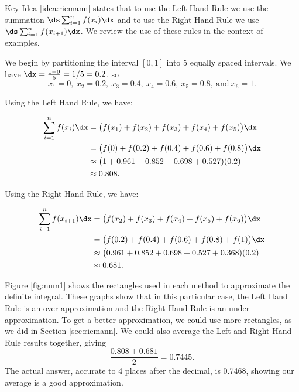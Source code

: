 Key Idea \ref{idea:riemann} states that to use the Left Hand Rule we use the summation $\ds \sum_{i=1}^n f(x_i)\dx$ and to use the Right Hand Rule we use $\ds \sum_{i=1}^n f(x_{i+1})\dx$. We review the use of these rules in the context of examples.\\

{We begin by partitioning the interval $[0,1]$ into 5 equally spaced intervals. We have $\dx = \frac{1-0}5 = 1/5=0.2$, so $$x_1 = 0,\ x_2 = 0.2,\ x_3 = 0.4,\ x_4 = 0.6,\ x_5 = 0.8,\ \text{and}\ x_6 = 1.$$

Using the Left Hand Rule, we have:

\begin{align*}
\sum_{i=1}^n f(x_i)\dx &= \big(f(x_1)+f(x_2) + f(x_3) + f(x_4) + f(x_5)\big)\dx \\
												&= \big(f(0) + f(0.2) + f(0.4) + f(0.6) + f(0.8)\big)\dx \\
												&\approx \big(1+0.961 + 0.852 + 0.698 + 0.527)(0.2)\\
												&\approx 0.808.
\end{align*}

Using the Right Hand Rule, we have:

\begin{align*}
\sum_{i=1}^n f(x_{i+1})\dx &= \big(f(x_2) + f(x_3) + f(x_4) + f(x_5)+f(x_6)\big)\dx \\
												&= \big(f(0.2) + f(0.4) + f(0.6) + f(0.8)+f(1)\big)\dx \\
												&\approx \big(0.961 +0.852 + 0.698 + 0.527 + 0.368)(0.2)\\
												&\approx 0.681.
\end{align*}


Figure \ref{fig:num1} shows the rectangles used in each method to approximate the definite integral. These graphs show that in this particular case, the Left Hand Rule is an over approximation and the Right Hand Rule is an under approximation. To get a better approximation, we could use more rectangles, as we did in Section \ref{sec:riemann}. We could also average the Left and Right Hand Rule results together, giving $$ \frac{0.808 + 0.681}{2} = 0.7445.$$ The actual answer, accurate to 4 places after the decimal, is 0.7468, showing our average is a good approximation.
}\\

